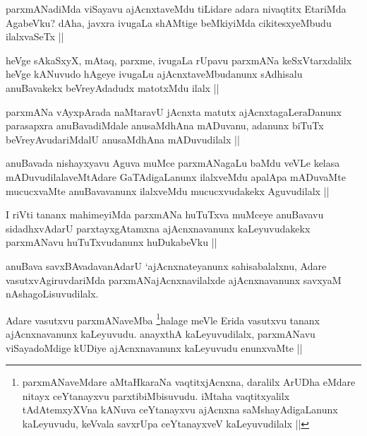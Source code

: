 \begin{artha}
parxmANadiMda viSayavu ajAcnxtaveMdu tiLidare adara nivaqtitx EtariMda AgabeVku? dAha, javxra ivugaLa shAMtige beMkiyiMda cikitesxyeMbudu ilalxvaSeTx ||
\end{artha}

\begin{artha}
heVge sAkaSxyX, mAtaq, parxme, ivugaLa rUpavu parxmANa keSxVtarxdalilx heVge kANuvudo hAgeye ivugaLu ajAcnxtaveMbudanunx sAdhisalu anuBavakekx beVreyAdadudx matotxMdu ilalx ||
\end{artha}

\begin{artha}
parxmANa vAyxpArada naMtaravU jAcnxta matutx ajAcnxtagaLeraDanunx parasapxra anuBavadiMdale anusaMdhAna mADuvanu, adanunx biTuTx beVreyAvudariMdalU anusaMdhAna mADuvudilalx ||
\end{artha}

\begin{artha}
anuBavada nishayxyavu Aguva muMce parxmANagaLu baMdu veVLe kelasa mADuvudilalaveMtAdare GaTAdigaLanunx ilalxveMdu apalApa mADuvaMte mucucxvaMte anuBavavanunx ilalxveMdu mucucxvudakekx Aguvudilalx ||
\end{artha}

\begin{artha}
I riVti tananx mahimeyiMda parxmANa huTuTxva muMceye anuBavavu sidadhxvAdarU parxtayxgAtamxna ajAcnxnavanunx kaLeyuvudakekx parxmANavu huTuTxvudanunx huDukabeVku ||
\end{artha}

\begin{artha}
anuBava savxBAvadavanAdarU `ajAcnxnateyanunx sahisabalalxnu, Adare vasutxvAgiruvdariMda parxmANajAcnxnavilalxde ajAcnxnavanunx savxyaM nAshagoLisuvudilalx.
\end{artha}

\begin{artha}
Adare vasutxvu parxmANaveMba \footnote{parxmANaveMdare aMtaHkaraNa vaqtitxjAcnxna, daralilx ArUDha eMdare nitayx ceYtanayxvu parxtibiMbisuvudu. iMtaha vaqtitxyalilx tAdAtemxyXVna kANuva ceYtanayxvu ajAcnxna saMshayAdigaLanunx kaLeyuvudu, keVvala savxrUpa ceYtanayxveV kaLeyuvudilalx ||}halage meVle Erida vasutxvu tananx ajAcnxnavanunx kaLeyuvudu. anayxthA kaLeyuvudilalx, parxmANavu viSayadoMdige kUDiye ajAcnxnavanunx kaLeyuvudu enunxvaMte ||
\end{artha}

